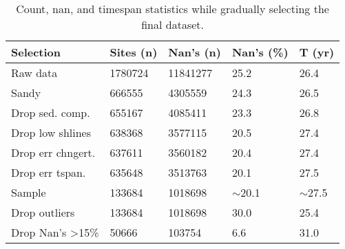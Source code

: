 \documentclass[format=sigconf, review=false, screen=true]{acmart}
\begin{document}
\begin{table}[ht]
	\centering
	\caption{Count, nan, and timespan statistics while gradually selecting the final dataset.}
	\label{tab:data-selection}
	\begin{tabular}{lllll}
		\toprule
		\textbf{Selection}           & \textbf{Sites (n)} & \textbf{Nan's (n)} & \textbf{Nan's (\%)} & \textbf{T (yr)} \\
		\midrule
		Raw data                     & 1780724              & 11841277           & 25.2                & 26.4             \\
		Sandy              & 666555               & 4305559            & 24.3                & 26.5             \\
		Drop sed. comp.    & 655167               & 4085411            & 23.3                & 26.8             \\
		Drop low shlines             & 638368               & 3577115            & 20.5                & 27.4             \\
		Drop err chngert.              & 637611               & 3560182            & 20.4                & 27.4             \\
		Drop err tspan.                 & 635648               & 3513763            & 20.1                & 27.5             \\
		Sample                       & 133684               & 1018698            & $\sim$20.1          & $\sim$27.5       \\
		Drop outliers                & 133684               & 1018698            & 30.0                & 25.4             \\
		Drop Nan's \textgreater 15\% & 50666                & 103754             & 6.6                 & 31.0            \\
		\bottomrule
	\end{tabular}
\end{table}  


%
\end{document}
